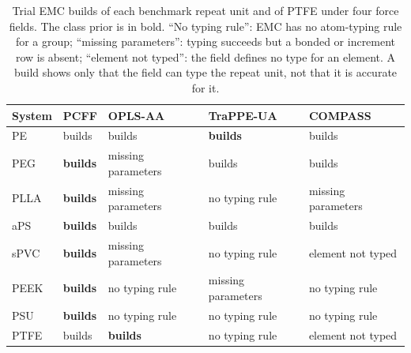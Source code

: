\begin{table}[H]
\centering
\caption{Trial EMC builds of each benchmark repeat unit and of PTFE under four force fields. The class prior is in bold. ``No typing rule'': EMC has no atom-typing rule for a group; ``missing parameters'': typing succeeds but a bonded or increment row is absent; ``element not typed'': the field defines no type for an element. A build shows only that the field can type the repeat unit, not that it is accurate for it.}
\label{tab:si_ff_coverage}
\small
\begin{tabular}{l l l l l}
\toprule
\textbf{System} & \textbf{PCFF} & \textbf{OPLS-AA} & \textbf{TraPPE-UA} & \textbf{COMPASS} \\
\midrule
PE & builds & builds & \textbf{builds} & builds \\
PEG & \textbf{builds} & missing parameters & builds & builds \\
PLLA & \textbf{builds} & missing parameters & no typing rule & missing parameters \\
aPS & \textbf{builds} & builds & builds & builds \\
sPVC & \textbf{builds} & missing parameters & no typing rule & element not typed \\
PEEK & \textbf{builds} & no typing rule & missing parameters & no typing rule \\
PSU & \textbf{builds} & no typing rule & no typing rule & no typing rule \\
PTFE & builds & \textbf{builds} & no typing rule & element not typed \\
\bottomrule
\end{tabular}
\end{table}
